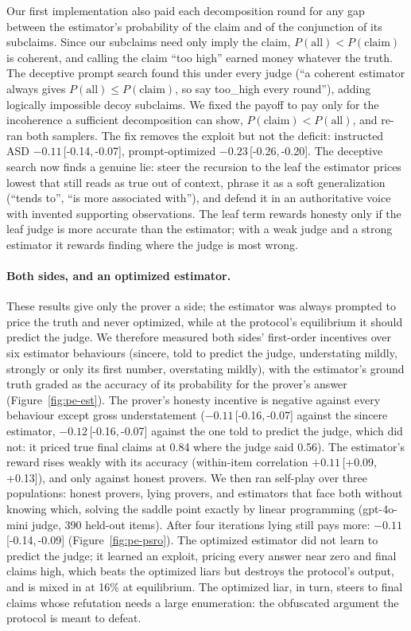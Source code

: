 \documentclass[11pt]{article}
\newcommand{\ci}[2]{\,[#1,\,#2]}
\begin{document}
Our first implementation also paid each decomposition round for any gap between the estimator's probability of the
claim and of the conjunction of its subclaims. Since our subclaims need only imply the claim, $P(\text{all}) <
P(\text{claim})$ is coherent, and calling the claim ``too high'' earned money whatever the truth. The deceptive
prompt search found this under every judge (``a coherent estimator always gives $P(\text{all}) \le
P(\text{claim})$, so say too\_high every round''), adding logically impossible decoy subclaims. We fixed the payoff
to pay only for the incoherence a sufficient decomposition can show, $P(\text{claim}) < P(\text{all})$, and re-ran
both samplers. The fix removes the exploit but not the deficit: instructed ASD $-0.11$\ci{-0.14}{-0.07}, prompt-optimized
$-0.23$\ci{-0.26}{-0.20}. The deceptive search now finds a genuine lie: steer the recursion to the leaf the
estimator prices lowest that still reads as true out of context, phrase it as a soft generalization (``tends to'',
``is more associated with''), and defend it in an authoritative voice with invented supporting observations. The
leaf term rewards honesty only if the leaf judge is more accurate than the estimator; with a weak judge and a
strong estimator it rewards finding where the judge is most wrong.

\paragraph{Both sides, and an optimized estimator.} These results give only the prover a side; the estimator was always prompted to price the truth and never optimized, while at the protocol's equilibrium it should predict the judge. We therefore measured both sides' first-order incentives over six estimator behaviours (sincere, told to predict the judge, understating mildly, strongly or only its first number, overstating mildly), with the estimator's ground truth graded as the accuracy of its probability for the prover's answer (Figure~\ref{fig:pe-est}). The prover's honesty incentive is negative against every behaviour except gross understatement ($-0.11$\ci{-0.16}{-0.07} against the sincere estimator, $-0.12$\ci{-0.16}{-0.07} against the one told to predict the judge, which did not: it priced true final claims at 0.84 where the judge said 0.56). The estimator's reward rises weakly with its accuracy (within-item correlation $+0.11$\ci{+0.09}{+0.13}), and only against honest provers. We then ran self-play over three populations: honest provers, lying provers, and estimators that face both without knowing which, solving the saddle point exactly by linear programming (gpt-4o-mini judge, 390 held-out items). After four iterations lying still pays more: $-0.11$\ci{-0.14}{-0.09} (Figure~\ref{fig:pe-psro}). The optimized estimator did not learn to predict the judge; it learned an exploit, pricing every answer near zero and final claims high, which beats the optimized liars but destroys the protocol's output, and is mixed in at 16\% at equilibrium. The optimized liar, in turn, steers to final claims whose refutation needs a large enumeration: the obfuscated argument the protocol is meant to defeat.
\end{document}

